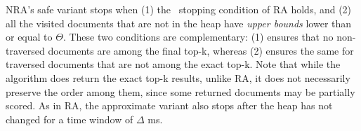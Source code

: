 NRA's safe variant stops when (1) the \RAStop\ stopping condition of RA holds, 
and (2) all the  visited documents that are not in the heap have \emph{upper bounds} lower than or equal to $\Theta$. These two conditions are complementary: (1) ensures that no non-traversed documents are among the final top-k, whereas (2) ensures the same for traversed documents that are not among the exact top-k. 
Note that while the algorithm does return the exact top-k results, unlike RA, it does not necessarily preserve the order among them, since some returned documents may be partially scored. As in RA, the approximate variant also stops after the heap has not changed for a time window of $\Delta$ ms.

